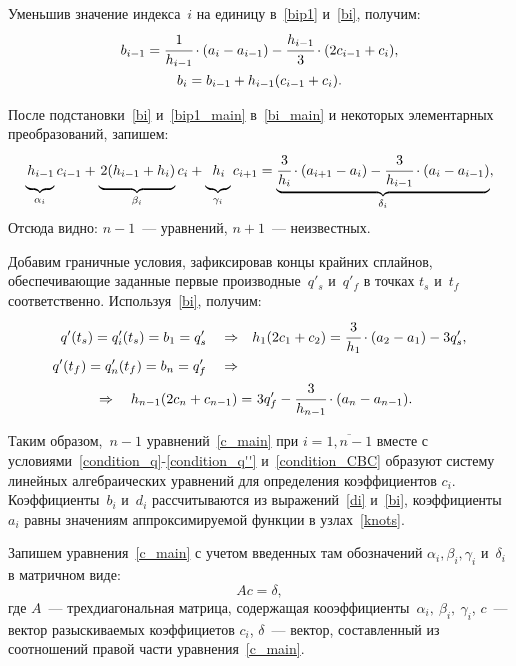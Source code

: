 Уменьшив значение индекса~$i$ на единицу в~\eqref{bip1} и~\eqref{bi}, получим:
\begin{gather}
	\label{bip1_main}
	b_{i-1} = \cfrac{1}{h_{i-1}} \cdot ( a_i - a_{i-1} ) - \cfrac{h_{i-1}}{3} \cdot ( 2 c_{i-1} + c_i ), \\
	\label{bi_main}
	b_i = b_{i-1} + h_{i-1} ( c_{i-1} + c_i ).
\end{gather}

После подстановки~\eqref{bi} и~\eqref{bip1_main} в~\eqref{bi_main} и некоторых элементарных преобразований, запишем:
\begin{equation}\label{c_main}
	\underbrace{\cfrac{}{} h_{i-1}}_{\alpha_i} c_{i-1} + \underbrace{\cfrac{}{} 2 ( h_{i-1} + h_i )}_{\beta_i} c_i + \underbrace{\cfrac{}{} h_i}_{\gamma_i} c_{i+1} = \underbrace{\cfrac{3}{h_i} \cdot ( a_{i+1} - a_i ) - \cfrac{3}{h_{i-1}} \cdot ( a_i - a_{i-1} )}_{\delta_i},
\end{equation}
Отсюда видно: $ n-1 $~--- уравнений, $ n+1 $~--- неизвестных.

Добавим граничные условия, зафиксировав концы крайних сплайнов, обеспечивающие заданные первые производные~$ q'_s $ и~$ q'_f $ в точках $ t_s $ и~$ t_f $ соответственно. Используя~\eqref{bi}, получим:
\begin{align}\label{condition_CBC} %
	q'(t_s) = q'_i (t_s) = b_1 = q'_s
	\quad \Rightarrow \quad&
	h_1 (2 c_1 + c_2) = \cfrac{3}{h_1} \cdot ( a_2 - a_1 ) - 3 q'_s,\\
	q'(t_f) = q'_n (t_f) = b_n = q'_f
	\quad \Rightarrow \quad& \\ 	\quad \Rightarrow \quad
	h_{n-1} (2 c_{n} + c_{n-1}) =&  \,\,3 q'_f - \cfrac{3}{h_{n-1}} \cdot ( a_{n} - a_{n-1} ).
\end{align}

Таким образом,~$ n-1 $ уравнений~\eqref{c_main} при $ i = \overline{1,n-1} $ вместе с условиями~\eqref{condition_q}-\eqref{condition_q''} и~\eqref{condition_CBC} образуют систему линейных алгебраических уравнений для определения коэффициентов $ c_i$. Коэффициенты~$ b_i $ и~$ d_i $ рассчитываются из выражений~\eqref{di} и~\eqref{bi}, коэффициенты~$ a_i $ равны значениям аппроксимируемой функции в узлах~\eqref{knots}.

Запишем уравнения~\eqref{c_main} с учетом введенных там обозначений $ \alpha_i, \beta_i, \gamma_i$ и~$\delta_i $ в матричном виде:
\begin{equation}\label{tridiagonal_eq}
	A c = \delta,
\end{equation}
где $ A $~--- трехдиагональная матрица, содержащая кооэффициенты~$\alpha_i, \:\beta_i, \:\gamma_i$, $ c $~--- вектор разыскиваемых коэффициетов $ c_i $, $ \delta $~--- вектор, составленный из соотношений правой части уравнения~\eqref{c_main}.

